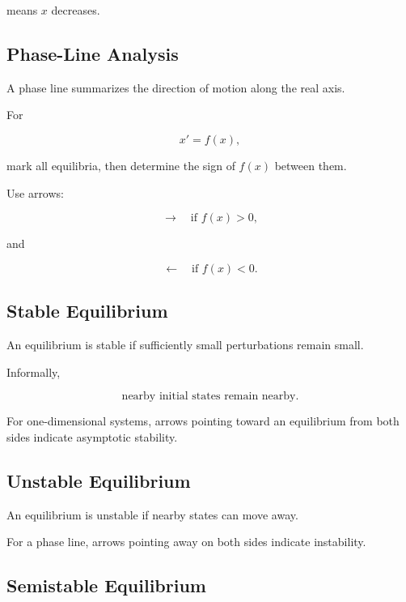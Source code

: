 means \(x\) decreases.

\subsection{Phase-Line Analysis}
\label{subsec:dynamical-phase-line}

A phase line summarizes the direction of motion along the real axis.

For

\[
x'=f(x),
\]

mark all equilibria, then determine the sign of \(f(x)\) between them.

Use arrows:

\[
\boxed{
\rightarrow
\quad
\text{if }f(x)>0,
}
\]

and

\[
\boxed{
\leftarrow
\quad
\text{if }f(x)<0.
}
\]

\subsection{Stable Equilibrium}
\label{subsec:dynamical-stable-equilibrium}

An equilibrium is stable if sufficiently small perturbations remain
small.

Informally,

\[
\boxed{
\text{nearby initial states remain nearby}.
}
\]

For one-dimensional systems, arrows pointing toward an equilibrium from
both sides indicate asymptotic stability.

\subsection{Unstable Equilibrium}
\label{subsec:dynamical-unstable-equilibrium}

An equilibrium is unstable if nearby states can move away.

For a phase line, arrows pointing away on both sides indicate instability.

\subsection{Semistable Equilibrium}
\label{subsec:semistable-equilibrium}


